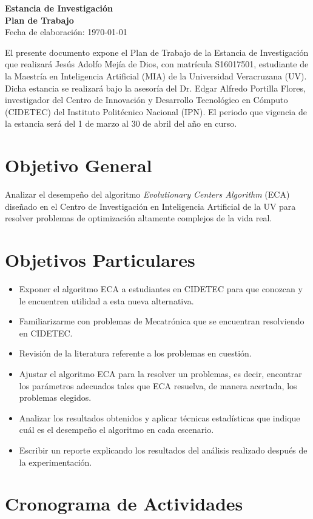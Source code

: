 \documentclass[12pt,letterpaper, xcolor=table, x11names]{article}
\newcommand{\mytitle}{ %
% 
	\vspace*{2cm}
	\begin{center}
		{\LARGE \bf Estancia de Investigación}\\[0.1cm]%
		{\Large \bf Plan de Trabajo}\\[0.4cm]%
		{\large Fecha de elaboración: \today}
	\end{center}
	\vspace{0.7cm}
}
\begin{document}
\mytitle

El presente documento expone el Plan de Trabajo de la Estancia de Investigación
que realizará Jesús Adolfo Mejía de Dios, con matrícula S16017501, estudiante de la
Maestría en Inteligencia Artificial (MIA) de la Universidad Veracruzana (UV). Dicha estancia se realizará bajo la asesoría del Dr. Edgar Alfredo Portilla Flores, investigador del Centro de Innovación y Desarrollo Tecnológico en Cómputo (CIDETEC) del Instituto Politécnico Nacional (IPN). El periodo que vigencia de la estancia será del 1 de marzo al 30 de abril del año en curso.

\section{Objetivo General}
Analizar el desempeño del algoritmo \textit{Evolutionary Centers Algorithm} (ECA) diseñado en el Centro de Investigación en Inteligencia Artificial de la UV para resolver problemas de optimización altamente complejos de la vida real.

\section{Objetivos Particulares}
\begin{itemize}
\item Exponer el algoritmo ECA a estudiantes en CIDETEC para que conozcan y le encuentren utilidad a esta nueva alternativa.
\item Familiarizarme con problemas de Mecatrónica que se encuentran resolviendo en CIDETEC.
\item Revisión de la literatura referente a los problemas en cuestión.
\item Ajustar el algoritmo ECA para la resolver un problemas, es decir, encontrar los parámetros adecuados tales que ECA resuelva, de manera acertada, los problemas elegidos.
\item Analizar los resultados obtenidos y aplicar técnicas estadísticas que indique cuál es el desempeño el algoritmo en cada escenario.
\item Escribir un reporte explicando los resultados del análisis realizado después de la experimentación.
\end{itemize}


\section{Cronograma de Actividades}
\end{document}
